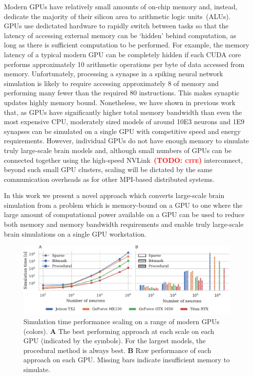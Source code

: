 \documentclass[9pt,twocolumn,twoside,lineno]{pnas-new}
\newcommand{\todo}[1]{\textbf{\textsc{\textcolor{red}{(TODO: #1)}}}}
\begin{document}
Modern GPUs have relatively small amounts of on-chip memory and, instead, dedicate the majority of their silicon area to arithmetic logic units~(ALUs).
GPUs use dedictated hardware to rapidly switch between tasks so that the latency of accessing external memory can be `hidden' behind computation, as long as there is sufficient computation to be performed.
For example, the memory latency of a typical modern GPU can be completely hidden if each CUDA core performs approximately 10 arithmetic operations per byte of data accessed from memory.
Unfortunately, processing a synapse in a spiking neural network simulation is likely to require accessing approximately \SI{8}{\byte} of memory and performing many fewer than the required 80 instructions. This makes synaptic updates highly memory bound.
Nonetheless, we have shown in previous work~\citep{Knight2018} that, as GPUs have significantly higher total memory bandwidth than even the most expensive CPU, moderately sized models of around \num{10E3} neurons and \num{1E9} synapses can be simulated on a single GPU with competitive speed and energy requirements.
However, individual GPUs do not have enough memory to simulate truly large-scale brain models and, although small numbers of GPUs can be connected together using the high-speed NVLink~\todo{cite} interconnect, beyond such small GPU clusters, scaling will be dictated by the same communication overheads as for other MPI-based distributed systems.

In this work we present a novel approach which converts large-scale brain simulation from a problem which is memory-bound on a GPU to one where the large amount of computational power available on a GPU can be used to reduce both memory and memory bandwidth requirements and enable truly large-scale brain simulations on a single GPU workstation.

\begin{figure}
    \centering
    \includegraphics{figures/performance_scaling}
    \caption{Simulation time performance scaling on a range of modern GPUs (colors). \textbf{A} The best performing approach at each scale on each GPU (indicated by the symbols). For the largest models, the procedural method is always best.
    \textbf{B} Raw performance of each approach on each GPU. Missing bars indicate insufficient memory to simulate.}
    \label{fig:performance_scaling}
\end{figure}
\end{document}
